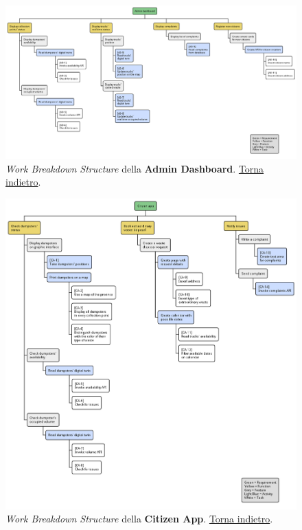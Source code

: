 \begin{figure}[H]
    \centering
    \includegraphics[width=\textwidth]{../img/wbs-admin-dashboard.pm}
    \caption{\textit{Work Breakdown Structure} della \textbf{Admin Dashboard}. \hyperlink{back:wbs-admin-dashboard}{Torna indietro}.}
    \label{fig:wbs-admin-dashboard}
\end{figure}

\begin{figure}[H]
    \centering
    \includegraphics[width=\textwidth]{../img/wbs-citizen-app.pm}
    \caption{\textit{Work Breakdown Structure} della \textbf{Citizen App}. \hyperlink{back:wbs-citizen-app}{Torna indietro}.}
    \label{fig:wbs-citizen-app}
\end{figure}

